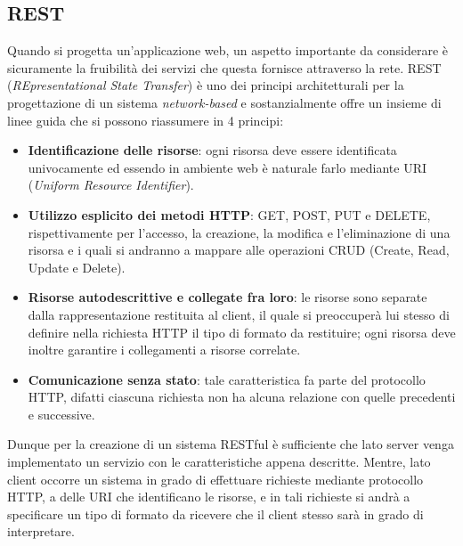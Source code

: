 \subsection{REST}
Quando si progetta un'applicazione web, un aspetto importante da considerare è sicuramente la fruibilità dei servizi che questa fornisce attraverso la rete. REST (\textit{REpresentational State Transfer}) è uno dei principi architetturali per la progettazione di un sistema \textit{network-based} e sostanzialmente offre un insieme di linee guida che si possono riassumere in 4 principi:
\begin{itemize}
    \item \textbf{Identificazione delle risorse}: ogni risorsa deve essere identificata univocamente ed essendo in ambiente web è naturale farlo mediante URI (\textit{Uniform Resource Identifier}).
    \item \textbf{Utilizzo esplicito dei metodi HTTP}: GET, POST, PUT e DELETE, rispettivamente per l'accesso, la creazione, la modifica e l'eliminazione di una risorsa e i quali si andranno a mappare alle operazioni CRUD (Create, Read, Update e Delete).
    \item \textbf{Risorse autodescrittive e collegate fra loro}: le risorse sono separate dalla rappresentazione restituita al client, il quale si preoccuperà lui stesso di definire nella richiesta HTTP il tipo di formato da restituire; ogni risorsa deve inoltre garantire i collegamenti a risorse correlate.
    \item \textbf{Comunicazione senza stato}: tale caratteristica fa parte del protocollo HTTP, difatti ciascuna richiesta non ha alcuna relazione con quelle precedenti e successive.
\end{itemize}

\noindent
Dunque per la creazione di un sistema RESTful è sufficiente che lato server venga implementato un servizio con le caratteristiche appena descritte. Mentre, lato client occorre un sistema in grado di effettuare richieste mediante protocollo HTTP, a delle URI che identificano le risorse, e in tali richieste si andrà a specificare un tipo di formato da ricevere che il client stesso sarà in grado di interpretare.

\let\cleardoublepage\clearpage
